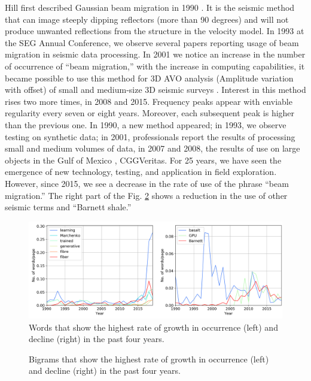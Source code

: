 \documentclass[geosciences,article,submit,moreauthors,pdftex]{Definitions/mdpi}
\begin{document}
Hill first described Gaussian beam migration in 1990 \citep{Hill1990}. It is the seismic method that can image steeply dipping reflectors (more than 90 degrees) and will not produce unwanted reflections from the structure in the velocity model. In 1993 at the SEG Annual Conference, we observe several papers reporting usage of beam migration in seismic data processing. In 2001 we notice an increase in the number of occurrence of ``beam migration,'' with the increase in computing capabilities, it became possible to use this method for 3D AVO analysis (Amplitude variation with offset) of small and medium-size 3D seismic surveys \citep{Huang2001}. Interest in this method rises two more times, in 2008 and 2015. Frequency peaks appear with enviable regularity every seven or eight years. Moreover, each subsequent peak is higher than the previous one. In 1990, a new method appeared; in 1993, we observe testing on synthetic data; in 2001, professionals report the results of processing small and medium volumes of data, in 2007 and 2008, the results of use on large objects in the Gulf of Mexico \citep{Ting2008}, CGGVeritas. For 25 years, we have seen the emergence of new technology, testing, and application in field exploration. However, since 2015, we see a decrease in the rate of use of the phrase ``beam migration.'' The right part of the Fig. \ref{bigrams} shows a reduction in the use of other seismic terms and ``Barnett shale.''


\begin{figure}[ht!]

\includegraphics[width=\textwidth]{si_grow_decl.png}
\caption{Words that show the highest rate of growth in occurrence (left) and decline (right) in the past four years.}
\label{sigrams}
\end{figure}

\begin{figure}[ht!]
\caption{Bigrams that show the highest rate of growth in occurrence (left) and decline (right) in the past four years.}
\label{bigrams}
\end{figure}
\end{document}
